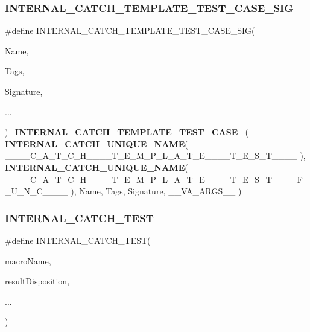 \subsubsection{INTERNAL\_CATCH\_TEMPLATE\_TEST\_CASE\_SIG}
{\footnotesize\ttfamily \#define I\+N\+T\+E\+R\+N\+A\+L\+\_\+\+C\+A\+T\+C\+H\+\_\+\+T\+E\+M\+P\+L\+A\+T\+E\+\_\+\+T\+E\+S\+T\+\_\+\+C\+A\+S\+E\+\_\+\+S\+IG(\begin{DoxyParamCaption}\item[{}]{Name,  }\item[{}]{Tags,  }\item[{}]{Signature,  }\item[{}]{... }\end{DoxyParamCaption})~\textbf{ I\+N\+T\+E\+R\+N\+A\+L\+\_\+\+C\+A\+T\+C\+H\+\_\+\+T\+E\+M\+P\+L\+A\+T\+E\+\_\+\+T\+E\+S\+T\+\_\+\+C\+A\+S\+E\+\_}( \textbf{ I\+N\+T\+E\+R\+N\+A\+L\+\_\+\+C\+A\+T\+C\+H\+\_\+\+U\+N\+I\+Q\+U\+E\+\_\+\+N\+A\+ME}( \+\_\+\+\_\+\+\_\+\+\_\+\+C\+\_\+\+A\+\_\+\+T\+\_\+\+C\+\_\+\+H\+\_\+\+\_\+\+\_\+\+\_\+\+T\+\_\+\+E\+\_\+\+M\+\_\+\+P\+\_\+\+L\+\_\+\+A\+\_\+\+T\+\_\+\+E\+\_\+\+\_\+\+\_\+\+\_\+\+T\+\_\+\+E\+\_\+\+S\+\_\+\+T\+\_\+\+\_\+\+\_\+\+\_\+ ), \textbf{ I\+N\+T\+E\+R\+N\+A\+L\+\_\+\+C\+A\+T\+C\+H\+\_\+\+U\+N\+I\+Q\+U\+E\+\_\+\+N\+A\+ME}( \+\_\+\+\_\+\+\_\+\+\_\+\+C\+\_\+\+A\+\_\+\+T\+\_\+\+C\+\_\+\+H\+\_\+\+\_\+\+\_\+\+\_\+\+T\+\_\+\+E\+\_\+\+M\+\_\+\+P\+\_\+\+L\+\_\+\+A\+\_\+\+T\+\_\+\+E\+\_\+\+\_\+\+\_\+\+\_\+\+T\+\_\+\+E\+\_\+\+S\+\_\+\+T\+\_\+\+\_\+\+\_\+\+\_\+\+F\+\_\+\+U\+\_\+\+N\+\_\+\+C\+\_\+\+\_\+\+\_\+\+\_\+ ), Name, Tags, Signature, \+\_\+\+\_\+\+V\+A\+\_\+\+A\+R\+G\+S\+\_\+\+\_\+ )}

\mbox{\label{catch_8hpp_ac3284f56c2f755d2b79fdb663cf9fb72}} 
\subsubsection{INTERNAL\_CATCH\_TEST}
{\footnotesize\ttfamily \#define I\+N\+T\+E\+R\+N\+A\+L\+\_\+\+C\+A\+T\+C\+H\+\_\+\+T\+E\+ST(\begin{DoxyParamCaption}\item[{}]{macro\+Name,  }\item[{}]{result\+Disposition,  }\item[{}]{... }\end{DoxyParamCaption})}

